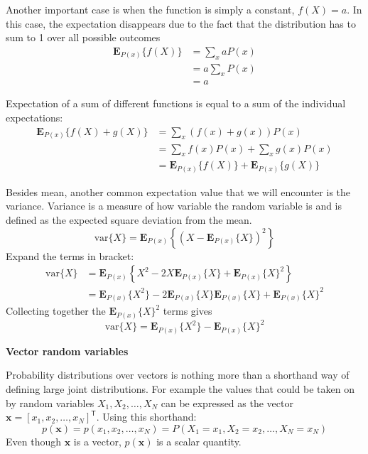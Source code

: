 \documentclass[a4paper,11pt]{article} %
\begin{document}
Another important case is when the function is simply a constant, $f(X)=a$.
In this case, the expectation
disappears due to the fact that the distribution has to sum to 1 over all possible outcomes
\begin{align*}
\mathbf{E}_{P(x)}\{f(X)\} & = \sum_{x} aP(x) \\
& = a \sum_{x} P(x) \\
& = a
\end{align*}

Expectation of a sum of different functions is equal to a sum of the individual expectations:
\begin{align*}
\mathbf{E}_{P(x)}\{ f(X) + g(X) \} & = \sum_{x} (f(x) + g(x)) P(x) \\
& = \sum_{x} f(x) P(x) + \sum_{x} g(x) P(x) \\
& = \mathbf{E}_{P(x)}\{ f(X) \} + \mathbf{E}_{P(x)}\{ g(X) \}
\end{align*}

Besides mean, another common expectation value that we will encounter is the variance.
Variance is a measure of how variable the random variable is and is defined as the expected
square deviation from the mean.
\begin{equation}
\mathrm{var}\{X\} = \mathbf{E}_{P(x)}\left\{ \left(X - \mathbf{E}_{P(x)}\{X\}\right)^2 \right\}
\end{equation}
Expand the terms in bracket:
\begin{align*}
\mathrm{var}\{X\} & = \mathbf{E}_{P(x)}\left\{
X^2 - 2X\mathbf{E}_{P(x)}\{X\} + \mathbf{E}_{P(x)}\{X\}^2
\right\} \\
& = \mathbf{E}_{P(x)}\{X^2\} - 2\mathbf{E}_{P(x)}\{X\}\mathbf{E}_{P(x)}\{X\} +
\mathbf{E}_{P(x)}\{X\}^2
\end{align*}
Collecting together the $\mathbf{E}_{P(x)}\{X\}^2$ terms gives
\begin{equation}
\mathrm{var}\{X\} = \mathbf{E}_{P(x)}\{X^2\} - \mathbf{E}_{P(x)}\{X\}^2
\end{equation}

\textbf{Vector random variables}

Probability distributions over vectors is nothing more than a shorthand way of defining
large joint distributions. For example the values that could be taken on by random variables
$X_{1}, X_{2}, \ldots, X_{N}$ can be expressed as the vector
$\mathbf{x} = [x_{1}, x_{2}, \ldots, x_{N}]^{\mathsf{T}}$. Using this shorthand:
\begin{equation}
p(\mathbf{x}) = p(x_1,x_2,\ldots,x_N) = P(X_1=x_1, X_2=x_2, \ldots, X_N=x_N)
\end{equation}
Even though $\mathbf{x}$ is a vector, $p(\mathbf{x})$ is a scalar quantity.
\end{document}
